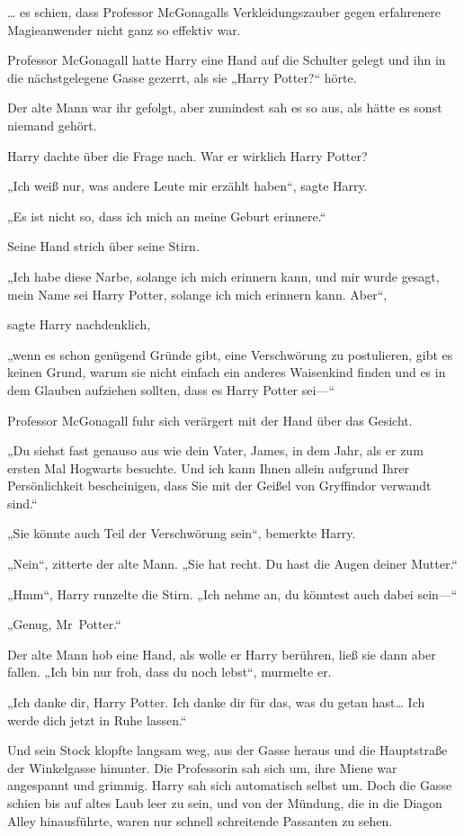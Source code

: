 {… es schien, dass Professor McGonagalls Verkleidungszauber gegen erfahrenere Magieanwender nicht ganz so effektiv war.

Professor McGonagall hatte Harry eine Hand auf die Schulter gelegt und ihn in die nächstgelegene Gasse gezerrt, als sie „Harry Potter?“ hörte.

Der alte Mann war ihr gefolgt, aber zumindest sah es so aus, als hätte es sonst niemand gehört.

Harry dachte über die Frage nach. War er wirklich Harry Potter?

„Ich weiß nur, was andere Leute mir erzählt haben“, sagte Harry.

„Es ist nicht so, dass ich mich an meine Geburt erinnere.“

Seine Hand strich über seine Stirn.

„Ich habe diese Narbe, solange ich mich erinnern kann, und mir wurde gesagt, mein Name sei Harry Potter, solange ich mich erinnern kann. Aber“,

sagte Harry nachdenklich,

„wenn es schon genügend Gründe gibt, eine Verschwörung zu postulieren, gibt es keinen Grund, warum sie nicht einfach ein anderes Waisenkind finden und es in dem Glauben aufziehen sollten, dass es Harry Potter sei—“

Professor McGonagall fuhr sich verärgert mit der Hand über das Gesicht.

„Du siehst fast genauso aus wie dein Vater, James, in dem Jahr, als er zum ersten Mal Hogwarts besuchte. Und ich kann Ihnen allein aufgrund Ihrer Persönlichkeit bescheinigen, dass Sie mit der Geißel von Gryffindor verwandt sind.“

„Sie könnte auch Teil der Verschwörung sein“, bemerkte Harry.

„Nein“, zitterte der alte Mann. „Sie hat recht. Du hast die Augen deiner Mutter.“

„Hmm“, Harry runzelte die Stirn. „Ich nehme an, du könntest auch dabei sein—“

„Genug, Mr~Potter.“

Der alte Mann hob eine Hand, als wolle er Harry berühren, ließ sie dann aber fallen. „Ich bin nur froh, dass du noch lebst“, murmelte er.

„Ich danke dir, Harry Potter. Ich danke dir für das, was du getan hast… Ich werde dich jetzt in Ruhe lassen.“

Und sein Stock klopfte langsam weg, aus der Gasse heraus und die Hauptstraße der Winkelgasse hinunter. Die Professorin sah sich um, ihre Miene war angespannt und grimmig. Harry sah sich automatisch selbst um. Doch die Gasse schien bis auf altes Laub leer zu sein, und von der Mündung, die in die Diagon Alley hinausführte, waren nur schnell schreitende Passanten zu sehen.

}
